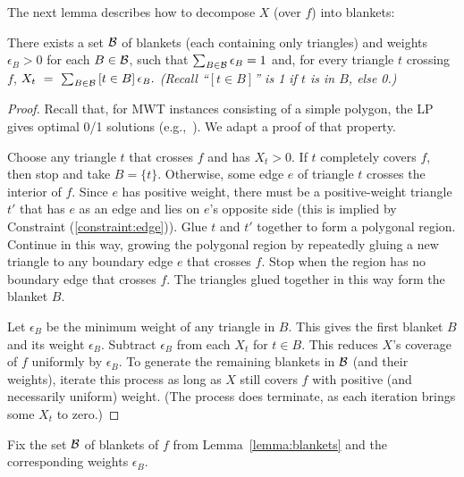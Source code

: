 \documentclass[final]{siamltex}
\newcommand{\blanket}{B} \newcommand{\blanketSet}{{\cal B}} \newcommand{\convPart}{\text{\sc cp}}
\newcommand{\edge}{e}
\newcommand{\face}{f}
\newcommand{\tri}{t}  \newcommand{\vertex}{v}
\newcommand{\fracTriang}{X}
\begin{document}
The next lemma describes how to decompose $\fracTriang$ (over $\face$) into blankets:
\begin{lemma}\label{lemma:blankets}
There exists a set $\blanketSet$ of blankets (each containing only triangles)
  and weights $\epsilon_\blanket>0$ for each $\blanket\in\blanketSet$,
  such that $\sum_{\blanket\in\blanketSet} \epsilon_\blanket = 1$ and, 
  for every triangle $\tri$ crossing $\face$,
  \( \fracTriang_\tri ~=~\sum_{\blanket\in\blanketSet} \,[\tri\in\blanket]\,\epsilon_{\blanket}.\)
  {\em (Recall ``$[\tri\in\blanket]$'' is 1 if $\tri$ is in $\blanket$, else 0.)}
\end{lemma}
\begin{proof}
  Recall that, for MWT instances consisting of a simple polygon, 
  the LP gives optimal 0/1 solutions (e.g.,~\cite[Thm.~7]{dantzig1985triangulations}).
  We adapt a proof of that property.

Choose any triangle $\tri$ that crosses $\face$ and has $\fracTriang_\tri>0$.
  If $\tri$ completely covers $\face$, then stop and take $\blanket = \{\tri\}$.
  Otherwise, some edge $\edge$ of triangle $\tri$ crosses the interior of $\face$.
  Since $\edge$ has positive weight, there must be a positive-weight triangle $\tri'$ 
  that has $\edge$ as an edge and lies on $\edge$'s opposite side
  (this is implied by Constraint (\ref{constraint:edge})).
  Glue $\tri$ and $\tri'$ together to form a polygonal region.
  Continue in this way, growing the polygonal region by
  repeatedly gluing a new triangle to any boundary edge $\edge$ that crosses $\face$.
  Stop when the region has no boundary edge that crosses $f$.
  The triangles glued together in this way form the blanket $\blanket$.

Let $\epsilon_\blanket$ be the minimum weight of any triangle in $\blanket$.
  This gives the first blanket $\blanket$ and its weight $\epsilon_\blanket$.
  Subtract $\epsilon_\blanket$ from each $\fracTriang_\tri$ for $\tri\in\blanket$.
  This reduces $\fracTriang$'s coverage of $\face$ uniformly by $\epsilon_\blanket$.
  To generate the remaining blankets in $\blanketSet$ (and their weights),
  iterate this process as long as $\fracTriang$ still covers $\face$ 
  with positive (and necessarily uniform) weight.
  (The process does terminate, as each iteration brings some $\fracTriang_\tri$ to zero.)
\end{proof}

Fix the set $\blanketSet$ of blankets of $\face$ from Lemma~\ref{lemma:blankets}
and the corresponding weights $\epsilon_\blanket$.
\end{document}
